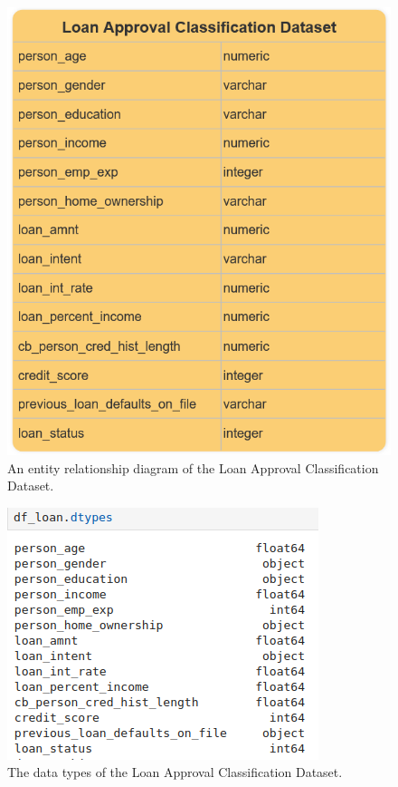 \documentclass[12pt]{report}
\begin{document}
\begin{figure}[H]
    \centering
    \includegraphics[width=.75\linewidth]{Loan-ERD.png}
    \caption{An entity relationship diagram of the Loan Approval Classification Dataset.}
    \label{fig:Loan-ERD}
\end{figure}

\begin{figure}[H]
    \centering
    \includegraphics[width=.6\linewidth]{pandas/Loan-DTypes.png}
    \caption{The data types of the Loan Approval Classification Dataset.}
    \label{fig:Loan-DTypes}
\end{figure}
\end{document}
